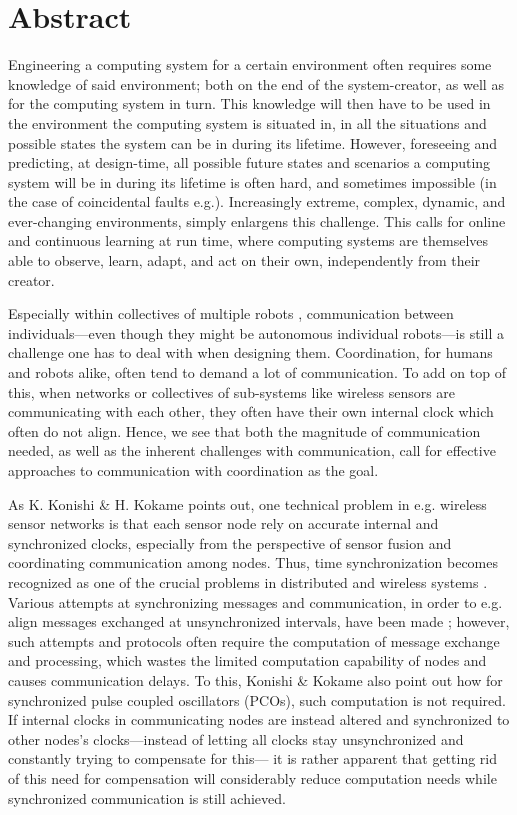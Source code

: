 \chapter*{Abstract}
\label{abstract}

Engineering a computing system for a certain environment often requires some knowledge of said environment; both on the end of the system-creator, as well as for the computing system in turn. This knowledge will then have to be used in the environment the computing system is situated in, in all the situations and possible states the system can be in during its lifetime. However, foreseeing and predicting, at design-time, all possible future states and scenarios a computing system will be in during its lifetime is often hard, and sometimes impossible (in the case of coincidental faults e.g.). Increasingly extreme, complex, dynamic, and ever-changing environments, simply enlargens this challenge. This calls for online and continuous learning at run time, where computing systems are themselves able to observe, learn, adapt, and act on their own, independently from their creator.

Especially within collectives of multiple robots \cite{cocoro, swarm_bot}, communication between individuals—even though they might be autonomous individual robots—is still a challenge one has to deal with when designing them. Coordination, for humans and robots alike, often tend to demand a lot of communication. To add on top of this, when networks or collectives of sub-systems like wireless sensors are communicating with each other, they often have their own internal clock which often do not align. Hence, we see that both the magnitude of communication needed, as well as the inherent challenges with communication, call for effective approaches to communication with coordination as the goal.

As K. Konishi \& H. Kokame \cite{konishi_kokame} points out, one technical problem in e.g. wireless sensor networks is that each sensor node rely on accurate internal and synchronized clocks, especially from the perspective of sensor fusion and coordinating communication among nodes. Thus, time synchronization becomes recognized as one of the crucial problems in distributed and wireless systems \cite{tungvinte_sync_protocols}. Various attempts at synchronizing messages and communication, in order to e.g. align messages exchanged at unsynchronized intervals, have been made \cite{tungvinte_sync_protocols}; however, such attempts and protocols often require the computation of message exchange and processing, which wastes the limited computation capability of nodes and causes communication delays. To this, Konishi \& Kokame \cite{konishi_kokame} also point out how for synchronized pulse coupled oscillators (PCOs), such computation is not required. If internal clocks in communicating nodes are instead altered and synchronized to other nodes's clocks—instead of letting all clocks stay unsynchronized and constantly trying to compensate for this— it is rather apparent that getting rid of this need for compensation will considerably reduce computation needs while synchronized communication is still achieved.

